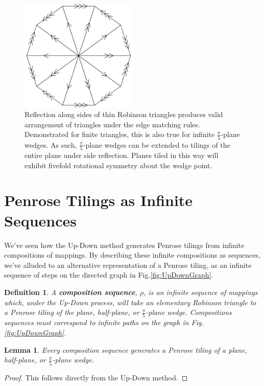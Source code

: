 \documentclass[
  oneside,
  11pt, a4paper,
  footinclude=true,
  headinclude=true,
  cleardoublepage=empty
]{scrbook}
\newtheorem{mydef}{Definition}
\newtheorem{mylem}{Lemma}
\begin{document}
\begin{figure}
\centering
\includegraphics[width=0.5\textwidth]{WedgeWheel}
\caption{Reflection along sides of thin Robinson triangles produces valid arrangement of triangles under the edge matching rules. Demonstrated for finite triangles, this is also true for infinite  $\frac{\pi}{5}$-plane wedges. As such,  $\frac{\pi}{5}$-plane wedges can be extended to tilings of the entire plane under side reflection. Planes tiled in this way will exhibit fivefold rotational symmetry about the wedge point.}
\label{fig:WedgeWheel}
\end{figure}

\section{Penrose Tilings as Infinite Sequences}
We've seen how the Up-Down method generates Penrose tilings from infinite compositions of mappings. By describing these infinite compositions as sequences, we've alluded to an alternative representation of a Penrose tiling, as an infinite sequence of steps on the directed graph in Fig.\ref{fig:UpDownGraph}. 

\begin{mydef}
A \textbf{composition sequence}, $\rho$, is an infinite sequence of mappings which, under the Up-Down process, will take an elementary Robinson triangle to a Penrose tiling of the plane, half-plane, or $\frac{\pi}{5}$-plane wedge. Compositions sequences must correspond to infinite paths on the graph in Fig.\ref{fig:UpDownGraph}.
\end{mydef}

\begin{mylem}
Every composition sequence generates a Penrose tiling of a plane, half-plane, or $\frac{\pi}{5}$-plane wedge.
\end{mylem}

\begin{proof}
This follows directly from the Up-Down method.
\end{proof}
\end{document}
